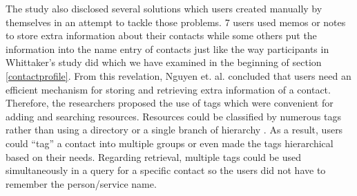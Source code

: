 The study also disclosed several solutions which users created manually by themselves in an attempt to tackle those problems. 7 users used memos or notes to store extra information about their contacts while some others put the information into the name entry of contacts just like the way participants in Whittaker's study did which we have examined in the beginning of section \ref{contactprofile}. From this revelation, Nguyen et. al. concluded that users need an efficient mechanism for storing and retrieving extra information of a contact. Therefore, the researchers proposed the use of tags which were convenient for adding and searching resources. Resources could be classified by numerous tags rather than using a directory or a single branch of hierarchy \cite{millen2005social}. As a result, users could ``tag'' a contact into multiple groups or even made the tags hierarchical based on their needs. Regarding retrieval, multiple tags could be used simultaneously in a query for a specific contact so the users did not have to remember the person/service name.



